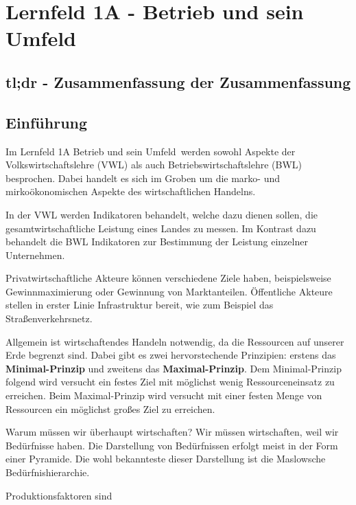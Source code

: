 \section{Lernfeld 1A - Betrieb und sein Umfeld}


\subsection{tl;dr - Zusammenfassung der Zusammenfassung}

\subsection{Einführung}
Im Lernfeld 1A \ql Betrieb und sein Umfeld\qr\ werden sowohl Aspekte der Volkswirtschaftslehre (VWL) als auch Betriebswirtschaftslehre (BWL) besprochen. Dabei handelt es sich im Groben um die marko- und mirkoökonomischen Aspekte des wirtschaftlichen Handelns.

In der VWL werden Indikatoren behandelt, welche dazu dienen sollen, die gesamtwirtschaftliche Leistung eines Landes zu messen. Im Kontrast dazu behandelt die BWL Indikatoren zur Bestimmung der Leistung einzelner Unternehmen.

Privatwirtschaftliche Akteure können verschiedene Ziele haben, beispielsweise Gewinnmaximierung oder Gewinnung von Marktanteilen. Öffentliche Akteure stellen in erster Linie Infrastruktur bereit, wie zum Beispiel das Straßenverkehrsnetz.

Allgemein ist wirtschaftendes Handeln notwendig, da die Ressourcen auf unserer Erde begrenzt sind. Dabei gibt es zwei hervorstechende Prinzipien: erstens das {\bf Minimal-Prinzip} und zweitens das {\bf Maximal-Prinzip}. Dem Minimal-Prinzip folgend wird versucht ein festes Ziel mit möglichst wenig Ressourceneinsatz zu erreichen. Beim Maximal-Prinzip wird versucht mit einer festen Menge von Ressourcen ein möglichst großes Ziel zu erreichen.

Warum müssen wir überhaupt wirtschaften? Wir müssen wirtschaften, weil wir Bedürfnisse haben. Die Darstellung von Bedürfnissen erfolgt meist in der Form einer Pyramide. Die wohl bekannteste dieser Darstellung ist die Maslowsche Bedürfnishierarchie.

Produktionsfaktoren sind 


